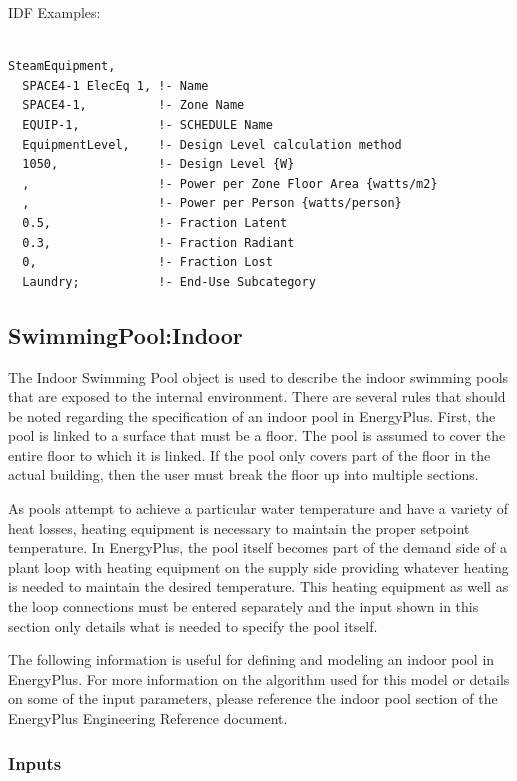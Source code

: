 IDF Examples:

\begin{lstlisting}

SteamEquipment,
  SPACE4-1 ElecEq 1, !- Name
  SPACE4-1,          !- Zone Name
  EQUIP-1,           !- SCHEDULE Name
  EquipmentLevel,    !- Design Level calculation method
  1050,              !- Design Level {W}
  ,                  !- Power per Zone Floor Area {watts/m2}
  ,                  !- Power per Person {watts/person}
  0.5,               !- Fraction Latent
  0.3,               !- Fraction Radiant
  0,                 !- Fraction Lost
  Laundry;           !- End-Use Subcategory
\end{lstlisting}

\subsection{SwimmingPool:Indoor}\label{swimmingpoolindoor}

The Indoor Swimming Pool object is used to describe the indoor swimming pools that are exposed to the internal environment. There are several rules that should be noted regarding the specification of an indoor pool in EnergyPlus. First, the pool is linked to a surface that must be a floor. The pool is assumed to cover the entire floor to which it is linked. If the pool only covers part of the floor in the actual building, then the user must break the floor up into multiple sections.

As pools attempt to achieve a particular water temperature and have a variety of heat losses, heating equipment is necessary to maintain the proper setpoint temperature. In EnergyPlus, the pool itself becomes part of the demand side of a plant loop with heating equipment on the supply side providing whatever heating is needed to maintain the desired temperature. This heating equipment as well as the loop connections must be entered separately and the input shown in this section only details what is needed to specify the pool itself.

The following information is useful for defining and modeling an indoor pool in EnergyPlus. For more information on the algorithm used for this model or details on some of the input parameters, please reference the indoor pool section of the EnergyPlus Engineering Reference document.

\subsubsection{Inputs}\label{inputs-7-012}

